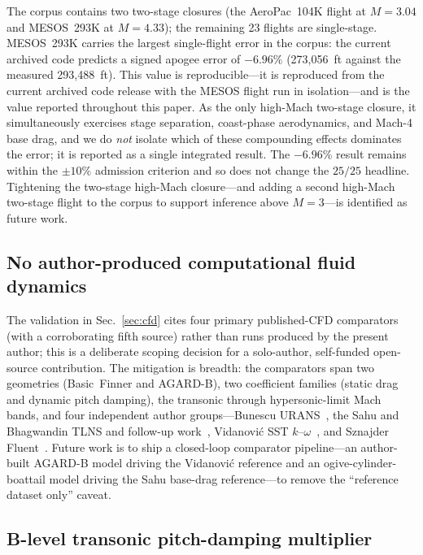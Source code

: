 The corpus contains two two-stage closures (the AeroPac~104K flight at
$M = 3.04$ and MESOS~293K at $M = 4.33$); the remaining 23 flights are
single-stage. MESOS~293K carries the largest single-flight error in the corpus:
the current archived code predicts a signed apogee error of $-6.96\%$
(273{,}056~ft against the measured 293{,}488~ft). This value is reproducible---it
is reproduced from the current archived code release with the MESOS flight run in
isolation---and is the value reported throughout this paper. As the only
high-Mach two-stage closure, it simultaneously exercises stage separation,
coast-phase aerodynamics, and Mach-4 base drag, and we do \emph{not} isolate
which of these compounding effects dominates the error; it is reported as a
single integrated result. The $-6.96\%$ result remains within the $\pm 10\%$
admission criterion and so does not change the $25/25$ headline. Tightening the
two-stage high-Mach closure---and adding a second high-Mach two-stage flight to
the corpus to support inference above $M = 3$---is identified as future work.

\subsection{No author-produced computational fluid dynamics}
\label{sec:lim-cfd}

The validation in Sec.~\ref{sec:cfd} cites four primary published-CFD comparators
(with a corroborating fifth source) rather
than runs produced by the present author; this is a deliberate scoping decision
for a solo-author, self-funded open-source contribution. The mitigation is
breadth: the comparators span two geometries (Basic~Finner and AGARD-B), two
coefficient families (static drag and dynamic pitch damping), the transonic
through hypersonic-limit Mach bands, and four independent author
groups---Bunescu URANS~\cite{bunescu2025}, the Sahu and Bhagwandin TLNS and
follow-up work~\cite{sahu1983,bhagwandin2013}, Vidanovi\'c SST
$k$--$\omega$~\cite{vidanovic2014}, and Sznajder Fluent~\cite{sznajder2025}.
Future work is to ship a closed-loop comparator pipeline---an author-built
AGARD-B model driving the Vidanovi\'c reference and an ogive-cylinder-boattail
model driving the Sahu base-drag reference---to remove the ``reference dataset
only'' caveat.

\subsection{B-level transonic pitch-damping multiplier}
\label{sec:lim-cmq}

